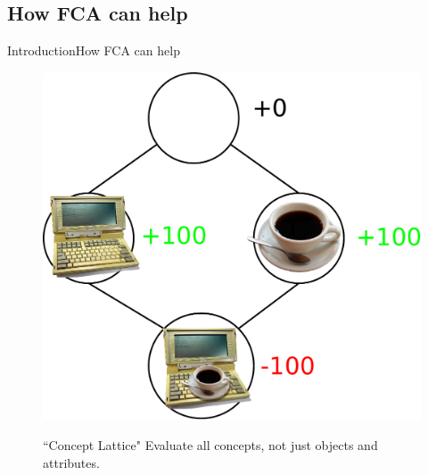 \subsection{How FCA can help}
\begin{frame}{Introduction}{How FCA can help}

\begin{figure}[ht]
\begin{minipage}[t]{0.55\linewidth}
\vspace{0pt}
\centering
\includegraphics[width=\textwidth]{img/introduction/fca_coffee.pdf}
\end{minipage}
\hfill
\begin{minipage}[t]{0.40\linewidth}
\vspace{0pt}
\begin{block}{``Concept Lattice"}
Evaluate all concepts, not just objects and attributes.
\end{block}
\end{minipage}
\end{figure}

\end{frame}